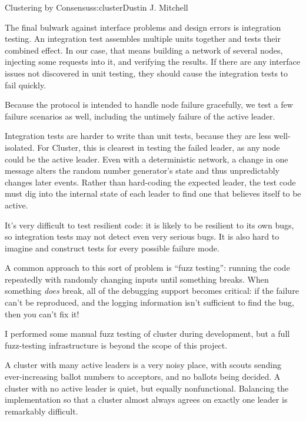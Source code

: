 \begin{aosachapter}{Clustering by Consensus}{s:cluster}{Dustin J. Mitchell}
\label{integration-testing}

The final bulwark against interface problems and design errors is
integration testing. An integration test assembles multiple units
together and tests their combined effect. In our case, that means
building a network of several nodes, injecting some requests into it,
and verifying the results. If there are any interface issues not
discovered in unit testing, they should cause the integration tests to
fail quickly.

Because the protocol is intended to handle node failure gracefully, we
test a few failure scenarios as well, including the untimely failure of
the active leader.

Integration tests are harder to write than unit tests, because they are
less well-isolated. For Cluster, this is clearest in testing the failed
leader, as any node could be the active leader. Even with a
deterministic network, a change in one message alters the random number
generator's state and thus unpredictably changes later events. Rather
than hard-coding the expected leader, the test code must dig into the
internal state of each leader to find one that believes itself to be
active.

\label{fuzz-testing}

It's very difficult to test resilient code: it is likely to be resilient
to its own bugs, so integration tests may not detect even very serious
bugs. It is also hard to imagine and construct tests for every possible
failure mode.

A common approach to this sort of problem is ``fuzz testing'': running
the code repeatedly with randomly changing inputs until something
breaks. When something \emph{does} break, all of the debugging support
becomes critical: if the failure can't be reproduced, and the logging
information isn't sufficient to find the bug, then you can't fix it!

I performed some manual fuzz testing of cluster during development, but
a full fuzz-testing infrastructure is beyond the scope of this project.

\label{power-struggles}

A cluster with many active leaders is a very noisy place, with scouts
sending ever-increasing ballot numbers to acceptors, and no ballots
being decided. A cluster with no active leader is quiet, but equally
nonfunctional. Balancing the implementation so that a cluster almost
always agrees on exactly one leader is remarkably difficult.


\end{aosachapter}
